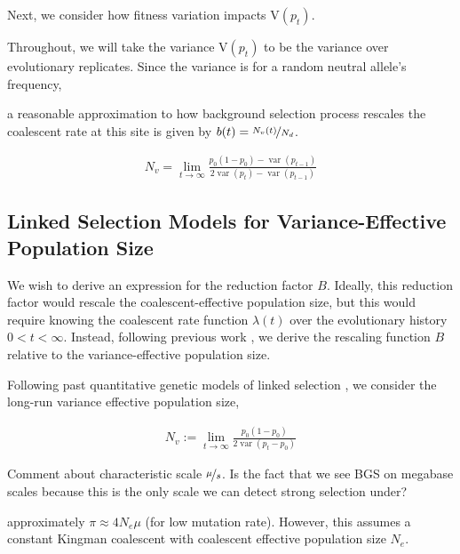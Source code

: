 \documentclass[11pt]{article}
\newcommand{\V}{\text{V}}
\DeclareMathOperator{\var}{var}
\begin{document}
Next, we consider how fitness variation impacts $\V(p_t)$.



Throughout, we will take the variance $\V(p_t)$ to be the variance over
evolutionary replicates. Since the variance is for a random neutral allele's
frequency, 






a reasonable approximation to how background selection process
rescales the coalescent rate at this site is given by $b(t) =
\nicefrac{N_v(t)}{N_d}$. 


\begin{align}
  N_v = \lim_{t \to \infty} \frac{p_0 (1 - p_0) - \var(p_{t-1})}{2\var(p_t) - \var(p_{t-1})}
\end{align}

\subsection*{Linked Selection Models for Variance-Effective Population Size}

We wish to derive an expression for the reduction factor $B$. Ideally, this
reduction factor would rescale the coalescent-effective population size, but
this would require knowing the coalescent rate function $\lambda(t)$ over the
evolutionary history $0 < t < \infty$. Instead, following previous work
\parencite{Santiago1995-hx,Santiago1998-bs}, we derive the rescaling function
$B$ relative to the variance-effective population size.

Following past quantitative genetic models of linked selection
\parencite{Robertson1961-ho,Santiago1995-hx,Santiago1998-bs,Santiago2016-mu},
we consider the long-run variance effective population size, 

\begin{align}
  N_v := \lim_{t \to \infty} \frac{p_0(1-p_0)}{2\var\left(p_t - p_0\right)}
\end{align}





Comment about characteristic scale $\nicefrac{\mu}{s}$. Is the fact that we see
BGS on megabase scales because this is the only scale we can detect strong
selection under?


approximately $\pi \approx 4N_e \mu$ (for low mutation rate). However, this
assumes a constant Kingman coalescent with coalescent effective population size
$N_e$. 
\end{document}

